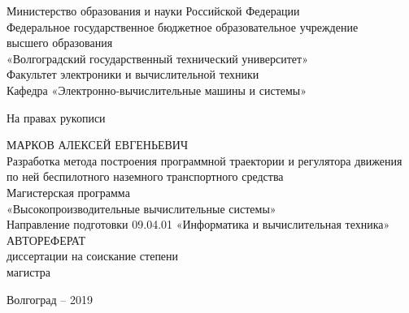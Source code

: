 


\thispagestyle{empty}

\begin{nospasing}
\begin{center}
    Министерство образования и науки Российской Федерации \\
    Федеральное государственное бюджетное образовательное учреждение \\
    высшего образования \\
    «Волгоградский государственный технический университет» \\
    Факультет электроники и вычислительной техники \\
    Кафедра «Электронно-вычислительные машины и системы» \\

    \begin{flushright}
    На правах рукописи \\
    \end{flushright}
    
    МАРКОВ АЛЕКСЕЙ ЕВГЕНЬЕВИЧ \\
    \vspace{1cm}
    Разработка метода построения программной траектории и регулятора движения по ней беспилотного
    наземного транспортного средства \\
    \vspace{1cm}
    Магистерская программа \\
    «Высокопроизводительные вычислительные системы» \\
    Направление подготовки 09.04.01 «Информатика и вычислительная техника» \\
    \vspace{1cm}
    АВТОРЕФЕРАТ \\
    \vspace{1cm}
    диссертации на соискание степени \\
    магистра \\
    
    \vfill
    
    Волгоград – 2019
\end{center}
\end{nospasing}

\newpage

